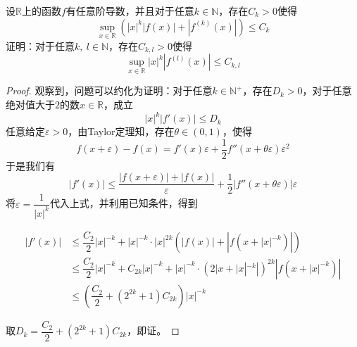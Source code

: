 \begin{proposition}

    设$\mathbb{R}$上的函数$f$有任意阶导数，并且对于任意$k \in \mathbb{N}$，存在$C_k > 0$使得
    $$\sup_{x \in \mathbb{R}}\left(|x|^k|f(x)| + |f^{(k)}(x)|\right) \leq C_k$$
    证明：对于任意$k,\ l \in \mathbb{N}$，存在$C_{k,l} > 0$使得
    $$\sup_{x \in \mathbb{R}}|x|^k|f^{(l)}(x)| \leq C_{k,l}$$

\end{proposition}

\begin{proof}

    观察到，问题可以约化为证明：对于任意$k \in \mathbb{N}^{+}$，存在$D_k > 0$，对于任意绝对值大于$2$的数$x \in \mathbb{R}$，成立
    $$|x|^k|f'(x)| \leq D_k$$
    任意给定$\varepsilon > 0$，由\textup{Taylor}定理知，存在$\theta \in (0,1)$，使得
    $$f(x + \varepsilon) - f(x) = f'(x)\varepsilon + \dfrac{1}{2}f''(x + \theta \varepsilon) \varepsilon^2$$
    于是我们有
    $$|f'(x)| \leq \dfrac{|f(x + \varepsilon)| + |f(x)|}{\varepsilon} + \dfrac{1}{2}|f''(x + \theta \varepsilon)| \varepsilon$$
    将$\varepsilon = \dfrac{1}{|x|^k}$代入上式，并利用已知条件，得到

    \begin{align*}
        |f'(x)| & \leq \dfrac{C_2}{2}|x|^{-k} + |x|^{-k} \cdot |x|^{2k}(|f(x)| + |f(x + |x|^{-k})|) \\
        & \leq \dfrac{C_2}{2}|x|^{-k} + C_{2k}|x|^{-k} + |x|^{-k} \cdot (2|x + |x|^{-k}|)^{2k}|f(x + |x|^{-k})| \\
        & \leq \left( \dfrac{C_2}{2} + (2^{2k} + 1)C_{2k} \right) |x|^{-k}
    \end{align*}

    取$D_k = \dfrac{C_2}{2} + (2^{2k} + 1)C_{2k}$，即证。
    
\end{proof}
